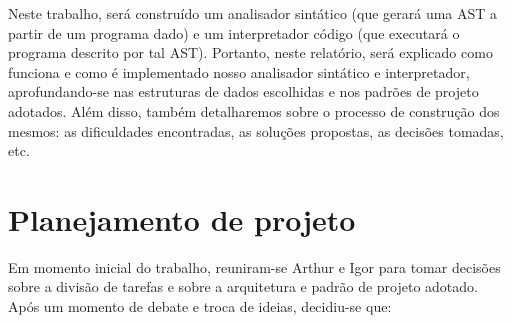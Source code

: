 \documentclass{article}
\begin{document}
Neste trabalho, será construído um analisador sintático (que gerará uma AST a partir de um programa dado) e um interpretador código (que executará o programa descrito por tal AST). Portanto, neste relatório, será explicado como funciona e como é implementado nosso analisador sintático e interpretador, aprofundando-se nas estruturas de dados escolhidas e nos padrões de projeto adotados. Além disso, também detalharemos sobre o processo de construção dos mesmos: as dificuldades encontradas, as soluções propostas, as decisões tomadas, etc.

\section{Planejamento de projeto}
Em momento inicial do trabalho, reuniram-se Arthur e Igor para tomar decisões sobre a divisão de tarefas e sobre a arquitetura e padrão de projeto adotado. Após um momento de debate e troca de ideias, decidiu-se que:
\end{document}
